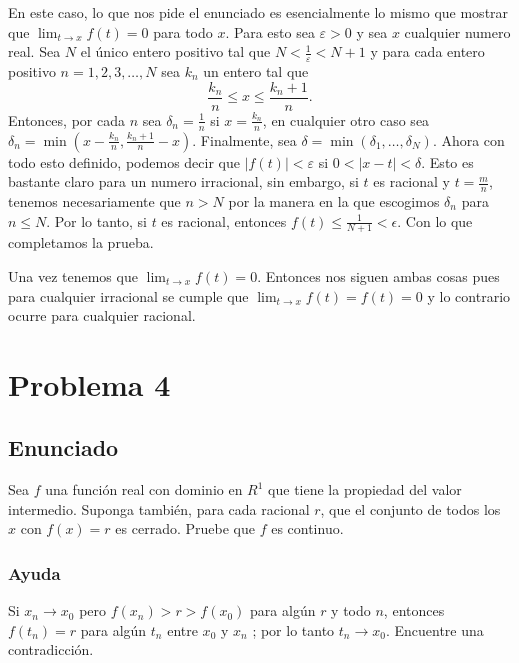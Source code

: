 \documentclass{report}
\begin{document}
En este caso, lo que nos pide el enunciado es esencialmente lo mismo que mostrar que $\displaystyle \lim_{t \to x} f\left( t \right) = 0 $ para todo $x$. Para esto sea $\varepsilon > 0$ y sea $x$ cualquier numero  real. Sea $N$ el único entero positivo tal que $N < \frac{1}{\varepsilon} < N + 1$ y para cada entero positivo $n = 1, 2, 3, \ldots, N$ sea $k_n$ un entero tal que \[
\frac{k_n}{n} \le x \le  \frac{k_n + 1}{n}
.\] Entonces, por cada $n$ sea $\delta_n = \frac{1}{n}$ si $x = \frac{k_n}{n}$, en cualquier otro caso sea $\delta_n = \min\left( x - \frac{k_n}{n}, \frac{k_n + 1}{n} - x \right) $. Finalmente, sea $\delta = \min\left( \delta_1, \ldots, \delta_N \right) $. Ahora con todo esto definido, podemos decir que $\left| f\left( t \right)  \right| < \varepsilon$ si $0 < \left| x - t \right| < \delta$. Esto es bastante claro para un numero irracional, sin embargo, si $t$ es racional y $t = \frac{m}{n}$, tenemos necesariamente  que $n > N$ por la manera en la que escogimos $\delta_n$ para  $n \le  N$. Por lo tanto, si $t$ es racional, entonces $f(t) \le \frac{1}{N + 1} < \epsilon$. Con lo que completamos la prueba.

Una vez tenemos que $\displaystyle \lim_{t \to x} f(t) = 0$. Entonces nos siguen ambas cosas pues para cualquier irracional se cumple que $\displaystyle \lim_{t \to x} f\left( t \right) = f\left( t \right) = 0$ y lo contrario ocurre para cualquier racional.

\chapter{Problema 4}
\section{Enunciado}


Sea $f$ una función real con dominio en $R^{1}$ que tiene la propiedad del valor intermedio. Suponga también, para cada racional $r$, que el conjunto de todos los $x$ con $f(x)=r$ es cerrado. Pruebe que $f$ es continuo.

\subsection{Ayuda}
Si $x_n \to x_0$ pero $f\left( x_n \right) > r > f\left( x_0 \right) $ para algún $r$ y todo $n$, entonces  $f\left( t_n \right) = r$ para algún $t_n$ entre $x_0$ y $x_n$ ; por lo tanto $t_n \to  x_0$. Encuentre una contradicción.
\end{document}
